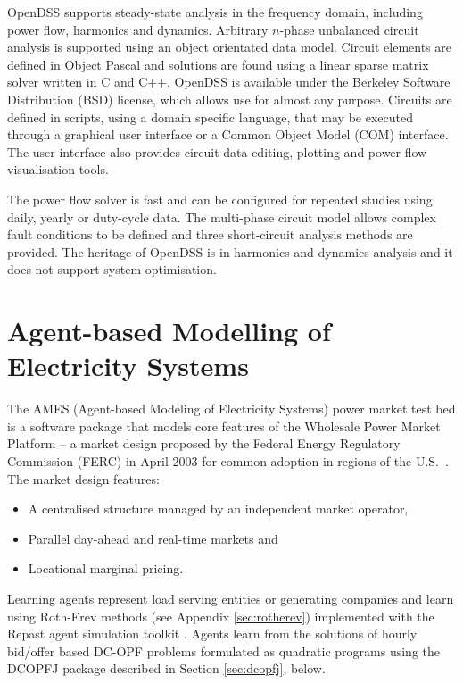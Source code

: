 OpenDSS supports steady-state analysis in the frequency domain, including power
flow, harmonics and dynamics.  Arbitrary $n$-phase unbalanced circuit analysis
is supported using an object orientated data model.  Circuit elements are defined in Object Pascal and solutions are found using a linear sparse matrix solver written in C and
C++.  OpenDSS is available under the Berkeley Software Distribution (BSD)
license, which allows use for almost any purpose.  Circuits are defined in
scripts, using a domain specific language, that may be executed through a
graphical user interface or a Common Object Model (COM) interface.  The user
interface also provides circuit data editing, plotting and power flow
visualisation tools.

The power flow solver is fast and can be configured for repeated
studies using daily, yearly or duty-cycle data.  The multi-phase circuit model allows
complex fault conditions to be defined and three short-circuit analysis methods
are provided.  The heritage of OpenDSS is in harmonics and dynamics analysis
and it does not support system optimisation.

\section{Agent-based Modelling of Electricity Systems}
\label{sec:ames}
The AMES (Agent-based Modeling of Electricity Systems) power market test bed is
a software package that models core features of the Wholesale Power Market
Platform -- a market design proposed by the Federal Energy Regulatory
Commission (FERC) in April 2003 for common adoption in regions of the
U.S.~\cite{tesfatsi:wpmp}. The market design features:
\begin{itemize}
  \item A centralised structure managed by an independent market operator,
  \item Parallel day-ahead and real-time markets and
  \item Locational marginal pricing.
\end{itemize}
Learning agents represent load serving entities or generating companies and
learn using Roth-Erev methods (see Appendix \ref{sec:rotherev})
implemented with the Repast agent simulation toolkit \cite{gieseler:thesis}.
Agents learn from the solutions of hourly bid/offer based
DC-OPF problems formulated as quadratic programs using the DCOPFJ package
\cite{tesfatsi:dcopf} described in Section \ref{sec:dcopfj}, below.

